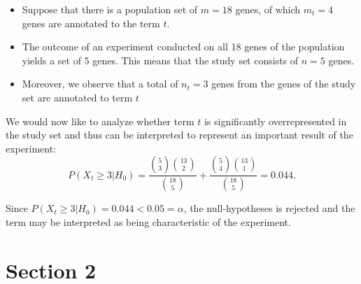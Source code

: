 \documentclass{beamer}
\begin{document}
\begin{frame}


\begin{itemize}
 \item  Suppose that there is a population set of $m=18$ genes, of which
  $m_t=4$ genes are annotated to the term $t$.
  \item The outcome of an
  experiment conducted on all 18 genes of the population yields a set
  of 5 genes. This means that the study set consists of $n=5$
  genes.
  \item Moreover, we observe that a total of $n_t=3$ genes from the
  genes of the study set are annotated to term
  $t$ 
\end{itemize}


  We would now like to analyze whether term $t$ is significantly
  overrepresented in the study set and thus can be interpreted to
  represent an important result of the experiment:
\[
P(X_t\geq 3|H_0) = \frac{\displaystyle{5 \choose 3}\displaystyle{{13} \choose {2}}}{\displaystyle{18 
\choose 5}} + \frac{\displaystyle{5 \choose 4}\displaystyle{{13} \choose {1}}}{\displaystyle{18 
\choose 5}}
   = 0.044.
\]
\begin{tiny}Since $P(X_t\geq 3|H_0)=0.044<0.05=\alpha$, the null-hypotheses is
rejected and the term may be interpreted as being characteristic of
the experiment.\end{tiny}

\end{frame}









\section{Section 2}

\end{document}
